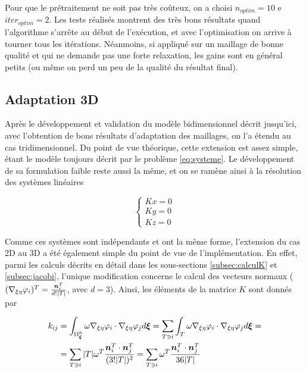 \indent Pour que le prétraitement ne soit pas très coûteux, on a choisi \(n_{optim} = 10\) e \(iter_{optim} = 2\). Les tests réalisés montrent des très bons résultats quand l'algorithme s'arrête au début de l'exécution, et avec l'optimisation on arrive à tourner tous les itérations. Néanmoins, si appliqué sur un maillage de bonne qualité et qui ne demande pas une forte relaxation, les gains sont en général petits (ou même on perd un peu de la qualité du résultat final).


\subsection{Adaptation 3D}

\indent Après le développement et validation du modèle bidimensionnel décrit jusqu'ici, avec l'obtention de bons résultats d'adaptation des maillages, on l'a étendu au cas tridimensionnel. Du point de vue théorique, cette extension est assez simple, étant le modèle toujours décrit par le problème \eqref{eq:systeme}. Le développement de sa formulation faible reste aussi la même, et on se ramène ainsi à la résolution des systèmes linéaires

\begin{equation*}
	\begin{cases}
		Kx = 0 \\
		Ky = 0 \\
		Kz = 0
	\end{cases}
\end{equation*}

\indent Comme ces systèmes sont indépendants et ont la même forme, l'extension du cas 2D au 3D a été également simple du point de vue de l'implémentation. En effet, parmi les calculs décrits en détail dans les sous-sections \ref{subsec:calculK} et \ref{subsec:jacobi}, l'unique modification concerne le calcul des vecteurs normaux (\((\nabla_{\xi\eta} \varphi_i)^T = \frac{\boldsymbol{n}_i^T}{d!|T|}\), avec \(d=3\)). Ainsi, les éléments de la matrice \(K\) sont donnés par


\begin{equation*}
\begin{gathered}
\begin{aligned}
	k_{ij} & = \int_{\Omega_{\boldsymbol{\xi}}^h}{ \omega \nabla_{\xi\eta} \varphi_i  \cdot \nabla_{\xi\eta} \varphi_j  d\boldsymbol{\xi}} = \sum_{T \ni i} {\int_{T}{ \omega \nabla_{\xi\eta} \varphi_i \cdot \nabla_{\xi\eta} \varphi_j  d\boldsymbol{\xi}}} = \\
	       &  = \sum_{T \ni i}
	              { 
	                     { |T|\omega^T \frac{\boldsymbol{n}_i^T\cdot \boldsymbol{n}_j^T}{(3!|T|)^2}
	                     }
	              }
	          = \sum_{T \ni i}
	              { 
	                     { \omega^T \frac{\boldsymbol{n}_i^T\cdot \boldsymbol{n}_j^T}{36|T|}
	                     }
	              }	              
\end{aligned}
\end{gathered}
\end{equation*}

